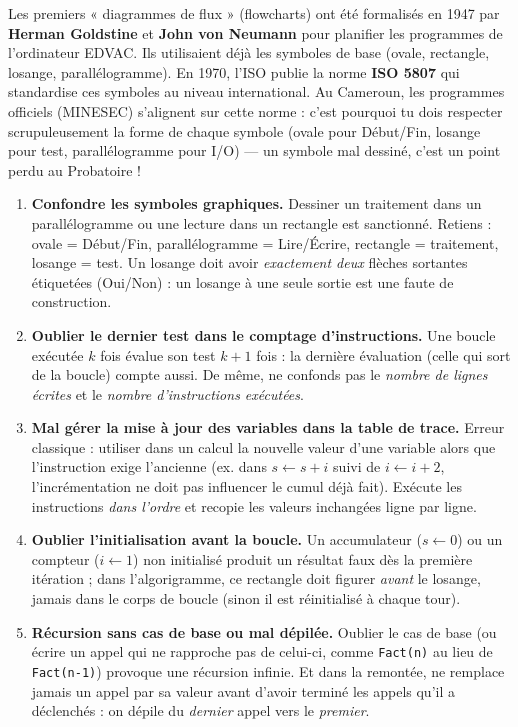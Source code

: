 \documentclass[11pt]{article}
\begin{document}
\begin{savaistu}
Les premiers « diagrammes de flux » (flowcharts) ont été formalisés en 1947 par \textbf{Herman Goldstine} et \textbf{John von Neumann} pour planifier les programmes de l'ordinateur EDVAC. Ils utilisaient déjà les symboles de base (ovale, rectangle, losange, parallélogramme). En 1970, l'ISO publie la norme \textbf{ISO 5807} qui standardise ces symboles au niveau international. Au Cameroun, les programmes officiels (MINESEC) s'alignent sur cette norme : c'est pourquoi tu dois respecter scrupuleusement la forme de chaque symbole (ovale pour Début/Fin, losange pour test, parallélogramme pour I/O) — un symbole mal dessiné, c'est un point perdu au Probatoire !
\end{savaistu}

\begin{attention}
\begin{enumerate}
  \item \textbf{Confondre les symboles graphiques.} Dessiner un traitement dans un parallélogramme ou une lecture dans un rectangle est sanctionné. Retiens : ovale = Début/Fin, parallélogramme = Lire/Écrire, rectangle = traitement, losange = test. Un losange doit avoir \emph{exactement deux} flèches sortantes étiquetées (Oui/Non) : un losange à une seule sortie est une faute de construction.
  \item \textbf{Oublier le dernier test dans le comptage d'instructions.} Une boucle exécutée $k$ fois évalue son test $k+1$ fois : la dernière évaluation (celle qui sort de la boucle) compte aussi. De même, ne confonds pas le \emph{nombre de lignes écrites} et le \emph{nombre d'instructions exécutées}.
  \item \textbf{Mal gérer la mise à jour des variables dans la table de trace.} Erreur classique : utiliser dans un calcul la nouvelle valeur d'une variable alors que l'instruction exige l'ancienne (ex. dans $s \leftarrow s + i$ suivi de $i \leftarrow i+2$, l'incrémentation ne doit pas influencer le cumul déjà fait). Exécute les instructions \emph{dans l'ordre} et recopie les valeurs inchangées ligne par ligne.
  \item \textbf{Oublier l'initialisation avant la boucle.} Un accumulateur ($s \leftarrow 0$) ou un compteur ($i \leftarrow 1$) non initialisé produit un résultat faux dès la première itération ; dans l'algorigramme, ce rectangle doit figurer \emph{avant} le losange, jamais dans le corps de boucle (sinon il est réinitialisé à chaque tour).
  \item \textbf{Récursion sans cas de base ou mal dépilée.} Oublier le cas de base (ou écrire un appel qui ne rapproche pas de celui-ci, comme \texttt{Fact(n)} au lieu de \texttt{Fact(n-1)}) provoque une récursion infinie. Et dans la remontée, ne remplace jamais un appel par sa valeur avant d'avoir terminé les appels qu'il a déclenchés : on dépile du \emph{dernier} appel vers le \emph{premier}.
\end{enumerate}
\end{attention}
\end{document}

